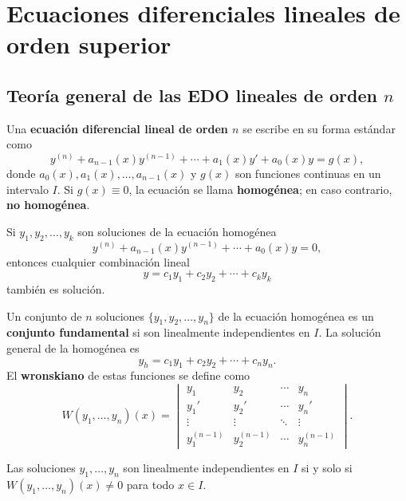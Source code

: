 \chapter{Ecuaciones diferenciales lineales de orden superior}

\section{Teoría general de las EDO lineales de orden $n$}

\begin{definition}
Una \textbf{ecuación diferencial lineal de orden $n$} se escribe en su forma estándar como
\[
y^{(n)} + a_{n-1}(x)y^{(n-1)} + \cdots + a_1(x)y' + a_0(x)y = g(x),
\]
donde $a_0(x), a_1(x), \ldots, a_{n-1}(x)$ y $g(x)$ son funciones continuas en un intervalo $I$. Si $g(x) \equiv 0$, la ecuación se llama \textbf{homogénea}; en caso contrario, \textbf{no homogénea}.
\end{definition}

\begin{theorem}\label{thm:cap28:superposicion}
Si $y_1, y_2, \ldots, y_k$ son soluciones de la ecuación homogénea
\[
y^{(n)} + a_{n-1}(x)y^{(n-1)} + \cdots + a_0(x)y = 0,
\]
entonces cualquier combinación lineal
\[
y = c_1 y_1 + c_2 y_2 + \cdots + c_k y_k
\]
también es solución.
\end{theorem}

\begin{definition}
Un conjunto de $n$ soluciones $\{y_1, y_2, \ldots, y_n\}$ de la ecuación homogénea es un \textbf{conjunto fundamental} si son linealmente independientes en $I$. La solución general de la homogénea es
\[
y_h = c_1 y_1 + c_2 y_2 + \cdots + c_n y_n.
\]
El \textbf{wronskiano} de estas funciones se define como
\[
W(y_1,\ldots,y_n)(x) =
\begin{vmatrix}
y_1 & y_2 & \cdots & y_n \\
y_1' & y_2' & \cdots & y_n' \\
\vdots & \vdots & \ddots & \vdots \\
y_1^{(n-1)} & y_2^{(n-1)} & \cdots & y_n^{(n-1)}
\end{vmatrix}.
\]
\end{definition}

\begin{theorem}\label{thm:cap28:wronskiano}
Las soluciones $y_1,\ldots,y_n$ son linealmente independientes en $I$ si y solo si $W(y_1,\ldots,y_n)(x) \neq 0$ para todo $x \in I$.
\end{theorem}

